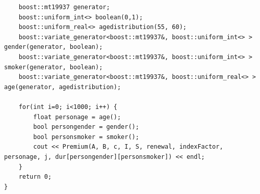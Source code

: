 \documentclass{report}
\begin{document}
\begin{verbatim}
    boost::mt19937 generator;
    boost::uniform_int<> boolean(0,1);
    boost::uniform_real<> agedistribution(55, 60);
    boost::variate_generator<boost::mt19937&, boost::uniform_int<> > gender(generator, boolean);
    boost::variate_generator<boost::mt19937&, boost::uniform_int<> > smoker(generator, boolean);
    boost::variate_generator<boost::mt19937&, boost::uniform_real<> > age(generator, agedistribution);

    for(int i=0; i<1000; i++) {
        float personage = age();
        bool persongender = gender();
        bool personsmoker = smoker();
        cout << Premium(A, B, c, I, S, renewal, indexFactor, personage, j, dur[persongender][personsmoker]) << endl;
    }
	return 0;
}


\end{verbatim}    
\end{document}
